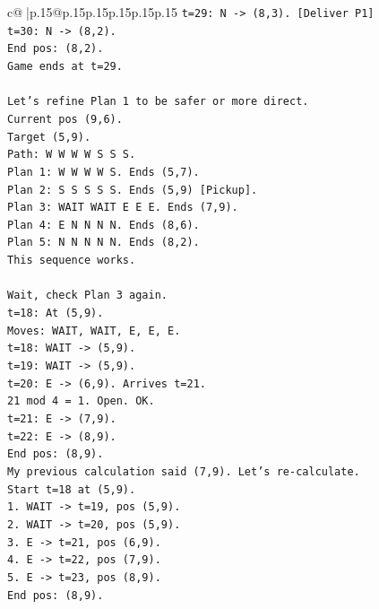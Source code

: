 \documentclass{article}
\begin{document}
{\begin{supertabular}{c@{$\;$}|p{.15\linewidth}@{}p{.15\linewidth}p{.15\linewidth}p{.15\linewidth}p{.15\linewidth}p{.15\linewidth}}
{{{\texttt{t=29: N {-}> (8,3). {[}Deliver P1{]}} \\
\texttt{t=30: N {-}> (8,2).} \\
\texttt{End pos: (8,2).} \\
\texttt{Game ends at t=29.} \\
\\ 
\texttt{Let's refine Plan 1 to be safer or more direct.} \\
\texttt{Current pos (9,6).} \\
\texttt{Target (5,9).} \\
\texttt{Path: W W W W S S S.} \\
\texttt{Plan 1: W W W W S. Ends (5,7).} \\
\texttt{Plan 2: S S S S S. Ends (5,9) {[}Pickup{]}.} \\
\texttt{Plan 3: WAIT WAIT E E E. Ends (7,9).} \\
\texttt{Plan 4: E N N N N. Ends (8,6).} \\
\texttt{Plan 5: N N N N N. Ends (8,2).} \\
\texttt{This sequence works.} \\
\\ 
\texttt{Wait, check Plan 3 again.} \\
\texttt{t=18: At (5,9).} \\
\texttt{Moves: WAIT, WAIT, E, E, E.} \\
\texttt{t=18: WAIT {-}> (5,9).} \\
\texttt{t=19: WAIT {-}> (5,9).} \\
\texttt{t=20: E {-}> (6,9). Arrives t=21.} \\
\texttt{21 mod 4 = 1. Open. OK.} \\
\texttt{t=21: E {-}> (7,9).} \\
\texttt{t=22: E {-}> (8,9).} \\
\texttt{End pos: (8,9).} \\
\texttt{My previous calculation said (7,9). Let's re{-}calculate.} \\
\texttt{Start t=18 at (5,9).} \\
\texttt{1. WAIT {-}> t=19, pos (5,9).} \\
\texttt{2. WAIT {-}> t=20, pos (5,9).} \\
\texttt{3. E {-}> t=21, pos (6,9).} \\
\texttt{4. E {-}> t=22, pos (7,9).} \\
\texttt{5. E {-}> t=23, pos (8,9).} \\
\texttt{End pos: (8,9).} \\
}}}
\end{supertabular}}
\end{document}
